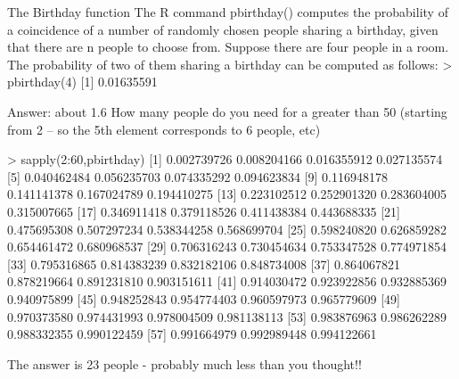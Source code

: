 The Birthday function
The R command pbirthday() computes the probability of a coincidence of a number of randomly chosen people sharing a birthday, given that there are n people to choose from.
Suppose there are four people in a room. The probability of two of them sharing a birthday can be computed as follows:
> pbirthday(4)
[1] 0.01635591

Answer:  about 1.6 %
How many people do you need for a greater than 50%
(starting from 2 – so the 5th element corresponds to 6 people, etc)

 > sapply(2:60,pbirthday)
 [1] 0.002739726 0.008204166 0.016355912 0.027135574
 [5] 0.040462484 0.056235703 0.074335292 0.094623834
 [9] 0.116948178 0.141141378 0.167024789 0.194410275
[13] 0.223102512 0.252901320 0.283604005 0.315007665
[17] 0.346911418 0.379118526 0.411438384 0.443688335
[21] 0.475695308 0.507297234 0.538344258 0.568699704
[25] 0.598240820 0.626859282 0.654461472 0.680968537
[29] 0.706316243 0.730454634 0.753347528 0.774971854
[33] 0.795316865 0.814383239 0.832182106 0.848734008
[37] 0.864067821 0.878219664 0.891231810 0.903151611
[41] 0.914030472 0.923922856 0.932885369 0.940975899
[45] 0.948252843 0.954774403 0.960597973 0.965779609
[49] 0.970373580 0.974431993 0.978004509 0.981138113
[53] 0.983876963 0.986262289 0.988332355 0.990122459
[57] 0.991664979 0.992989448 0.994122661

The answer is 23 people - probably much less than you thought!!

